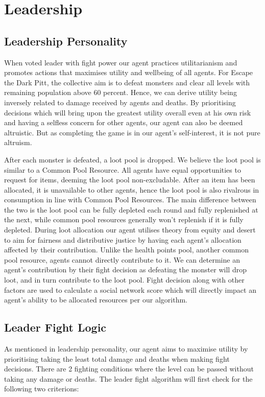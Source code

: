 \section{Leadership}
\subsection{Leadership Personality}
When voted leader with fight power our agent practices utilitarianism \cite{pitt} and promotes actions that maximises utility and wellbeing of all agents. For Escape the Dark Pitt, the collective aim is to defeat monsters and clear all levels with remaining population above 60 percent. Hence, we can derive utility being inversely related to damage received by agents and deaths. By prioritising decisions which will bring upon the greatest utility overall even at his own risk and having a selfless concern for other agents, our agent can also be deemed altruistic. But as completing the game is in our agent's self-interest, it is not pure altruism.

After each monster is defeated, a loot pool is dropped. We believe the loot pool is similar to a Common Pool Resource. All agents have equal opportunities to request for items, deeming the loot pool non-excludable. After an item has been allocated, it is unavailable to other agents, hence the loot pool is also rivalrous in consumption in line with Common Pool Resources. The main difference between the two is the loot pool can be fully depleted each round and fully replenished at the next, while common pool resources generally won't replenish if it is fully depleted. During loot allocation our agent utilises theory from equity and desert \cite{pitt} to aim for fairness and distributive justice by having each agent's allocation affected by their contribution. Unlike the health points pool, another common pool resource, agents cannot directly contribute to it. We can determine an agent's contribution by their fight decision as defeating the monster will drop loot, and in turn contribute to the loot pool. Fight decision along with other factors are used to calculate a social network score which will directly impact an agent's ability to be allocated resources per our algorithm.

\subsection{Leader Fight Logic}
As mentioned in leadership personality, our agent aims to maximise utility by prioritising taking the least total damage and deaths when making fight decisions. There are 2 fighting conditions where the level can be passed without taking any damage or deaths. The leader fight algorithm will first check for the following two criterions:

